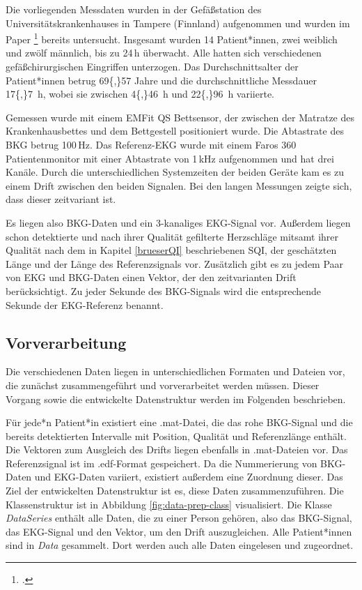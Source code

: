 	Die vorliegenden Messdaten wurden in der Gefäßstation des Universitätskrankenhauses in Tampere (Finnland) aufgenommen und wurden im Paper \footcite{HoogAntink2020} bereits untersucht. Insgesamt wurden 14 Patient*innen, zwei weiblich und zwölf männlich, bis zu 24\,h überwacht. Alle hatten sich verschiedenen gefäßchirurgischen Eingriffen unterzogen. Das Durchschnittsalter der Patient*innen betrug \num{69{,}57} Jahre und die durchschnittliche Messdauer \SI{17{,}7}{\hour}, wobei sie zwischen \SI{4{,}46}{\hour} und \SI{22{,}96}{\hour} variierte.
	
	Gemessen wurde mit einem EMFit QS Bettsensor, der zwischen der Matratze des Krankenhausbettes und dem Bettgestell positioniert wurde. Die Abtastrate des \ac{BKG} betrug 100\,Hz. Das Referenz-\ac{EKG} wurde mit einem Faros 360 Patientenmonitor mit einer Abtastrate von 1\,kHz aufgenommen und hat drei Kanäle. Durch die unterschiedlichen Systemzeiten der beiden Geräte kam es zu einem Drift zwischen den beiden Signalen. Bei den langen Messungen zeigte sich, dass dieser zeitvariant ist.
	
	Es liegen also \ac{BKG}-Daten und ein 3-kanaliges \ac{EKG}-Signal vor. Außerdem liegen schon detektierte und nach ihrer Qualität gefilterte Herzschläge mitsamt ihrer Qualität nach dem in Kapitel \ref{brueserQI} beschriebenen \ac{SQI}, der geschätzten Länge und der Länge des Referenzsignals vor. Zusätzlich gibt es zu jedem Paar von \ac{EKG} und \ac{BKG}-Daten einen Vektor, der den zeitvarianten Drift berücksichtigt. Zu jeder Sekunde des \ac{BKG}-Signals wird die entsprechende Sekunde der \ac{EKG}-Referenz benannt.
	
	\subsection{Vorverarbeitung}
	
	Die verschiedenen Daten liegen in unterschiedlichen Formaten und Dateien vor, die zunächst zusammengeführt und vorverarbeitet werden müssen. Dieser Vorgang sowie die entwickelte Datenstruktur werden im Folgenden beschrieben.
	
	Für jede*n Patient*in existiert eine .mat-Datei, die das rohe \ac{BKG}-Signal und die bereits detektierten Intervalle mit Position, Qualität und Referenzlänge enthält. Die Vektoren zum Ausgleich des Drifts liegen ebenfalls in .mat-Dateien vor. Das Referenzsignal ist im .edf-Format gespeichert. Da die Nummerierung von \ac{BKG}-Daten und \ac{EKG}-Daten variiert, existiert außerdem eine Zuordnung dieser. Das Ziel der entwickelten Datenstruktur ist es, diese Daten zusammenzuführen. Die Klassenstruktur ist in Abbildung \ref{fig:data-prep-class} visualisiert. Die Klasse \textit{DataSeries} enthält alle Daten, die zu einer Person gehören, also das \ac{BKG}-Signal, das \ac{EKG}-Signal und den Vektor, um den Drift auszugleichen. Alle Patient*innen sind in \textit{Data} gesammelt. Dort werden auch alle Daten eingelesen und zugeordnet.
	
